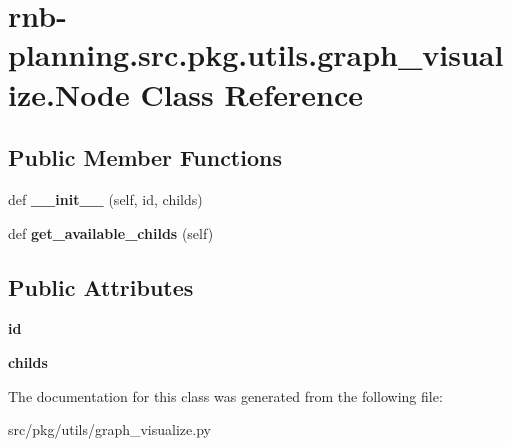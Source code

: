 \hypertarget{classrnb-planning_1_1src_1_1pkg_1_1utils_1_1graph__visualize_1_1_node}{}\section{rnb-\/planning.src.\+pkg.\+utils.\+graph\+\_\+visualize.\+Node Class Reference}
\label{classrnb-planning_1_1src_1_1pkg_1_1utils_1_1graph__visualize_1_1_node}
\subsection*{Public Member Functions}
\begin{DoxyCompactItemize}
\item 
\mbox{\label{classrnb-planning_1_1src_1_1pkg_1_1utils_1_1graph__visualize_1_1_node_a12ff4fcbbc9b132898d505437010d29e}} 
def {\bfseries \+\_\+\+\_\+init\+\_\+\+\_\+} (self, id, childs)
\item 
\mbox{\label{classrnb-planning_1_1src_1_1pkg_1_1utils_1_1graph__visualize_1_1_node_ad8a0123c88711050176cf667a316b1f0}} 
def {\bfseries get\+\_\+available\+\_\+childs} (self)
\end{DoxyCompactItemize}
\subsection*{Public Attributes}
\begin{DoxyCompactItemize}
\item 
\mbox{\label{classrnb-planning_1_1src_1_1pkg_1_1utils_1_1graph__visualize_1_1_node_aab0df5d07d8cc87c410810af9273fa9b}} 
{\bfseries id}
\item 
\mbox{\label{classrnb-planning_1_1src_1_1pkg_1_1utils_1_1graph__visualize_1_1_node_acb50115207558681896788e712400424}} 
{\bfseries childs}
\end{DoxyCompactItemize}


The documentation for this class was generated from the following file\+:\begin{DoxyCompactItemize}
\item 
src/pkg/utils/graph\+\_\+visualize.\+py\end{DoxyCompactItemize}
